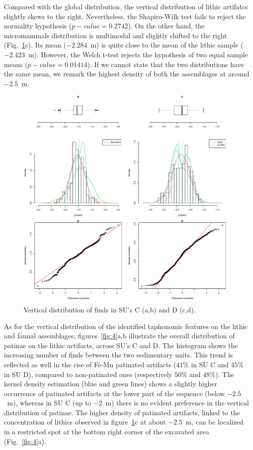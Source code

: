 \documentclass[review,authoryear]{elsarticle} %
\begin{document}
Compared with the global distribution, the vertical distribution of lithic artifatcs slightly skews to the right. Nevertheless, the Shapiro-Wilk test fails to reject the normality hypothesis ($p-value=0.2742$). On the other hand, the micromammals distribution is multimodal and slightly shifted to the right (Fig.~\ref{fig:3}c). Its mean ($-2.284$~m) is quite close to the mean of the lithic sample ($-2.423$~m). However, the Welch t-test rejects the hypothesis of two equal sample means ($p-value=0.01414$). If we cannot state that the two distributions have the same mean, we remark the highest density of both the assemblages at around $-2.5$~m.

\begin{figure}
  \centering
  \includegraphics[width=1\textwidth]{../artwork/Fig3.pdf}
  \caption{Vertical distribution of finds in SU's C (a,b) and D (c,d).}
  \label{fig:3}
\end{figure}

As for the vertical distribution of the identified taphonomic features on the lithic and faunal assemblages, figures~\ref{fig:4}a,b illustrate the overall distribution of patinae on the lithic artifacts, across SU's C and D. The histogram shows the increasing number of finds between the two sedimentary units. This trend is reflected as well in the rise of Fe-Mn patinated artifacts ($41\%$ in SU C and $45\%$ in SU D), compared to non-patinated ones (respectively $50\%$ and $48\%$). The kernel density estimation (blue and green lines) shows a slightly higher occurrence of patinated artifacts at the lower part of the sequence (below $-2.5$~m), whereas in SU C (up to $-2$~m) there is no evident preference in the vertical distribution of patinae. The higher density of patinated artifacts, linked to the concentration of lithics observed in figure~\ref{fig:3}c at about $-2.5$~m, can be localized in a restricted spot at the bottom right corner of the excavated area (Fig.~\ref{fig:4}a).
\end{document}
